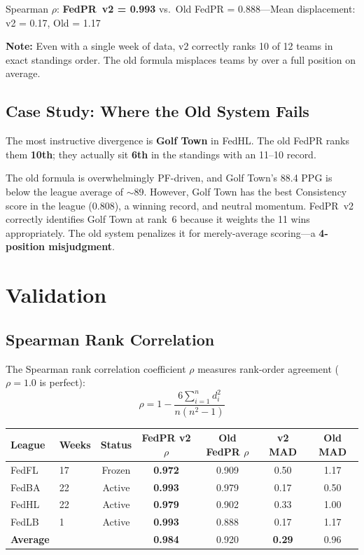 \documentclass[11pt,a4paper]{article}
\begin{document}
\noindent Spearman $\rho$: \textbf{FedPR~v2 = 0.993} vs.\ Old FedPR = 0.888\quad---\quad Mean displacement: v2 = 0.17, Old = 1.17

\textbf{Note:} Even with a single week of data, v2 correctly ranks 10 of 12 teams in exact standings order. The old formula misplaces teams by over a full position on average.


\subsection{Case Study: Where the Old System Fails}

The most instructive divergence is \textbf{Golf Town} in FedHL. The old FedPR ranks them \textbf{10th}; they actually sit \textbf{6th} in the standings with an 11--10 record.

The old formula is overwhelmingly PF-driven, and Golf Town's 88.4 PPG is below the league average of $\sim$89. However, Golf Town has the best Consistency score in the league (0.808), a winning record, and neutral momentum. FedPR~v2 correctly identifies Golf Town at rank~6 because it weights the 11 wins appropriately. The old system penalizes it for merely-average scoring---a \textbf{4-position misjudgment}.


\section{Validation}\label{sec:validation}

\subsection{Spearman Rank Correlation}

The Spearman rank correlation coefficient $\rho$ measures rank-order agreement ($\rho = 1.0$ is perfect):
\[
\rho = 1 - \frac{6 \sum_{i=1}^{n} d_i^2}{n(n^2 - 1)}
\]

\begin{table}[H]
\centering
\begin{tabular}{@{}llccccc@{}}
\toprule
\textbf{League} & \textbf{Weeks} & \textbf{Status} & \textbf{FedPR v2 $\rho$} & \textbf{Old FedPR $\rho$} & \textbf{v2 MAD} & \textbf{Old MAD}\\
\midrule
FedFL & 17 & Frozen & \textbf{0.972} & 0.909 & 0.50 & 1.17\\
FedBA & 22 & Active & \textbf{0.993} & 0.979 & 0.17 & 0.50\\
FedHL & 22 & Active & \textbf{0.979} & 0.902 & 0.33 & 1.00\\
FedLB & 1 & Active & \textbf{0.993} & 0.888 & 0.17 & 1.17\\
\midrule
\textbf{Average} & & & \textbf{0.984} & 0.920 & \textbf{0.29} & 0.96\\
\bottomrule
\end{tabular}
\end{table}
\end{document}
